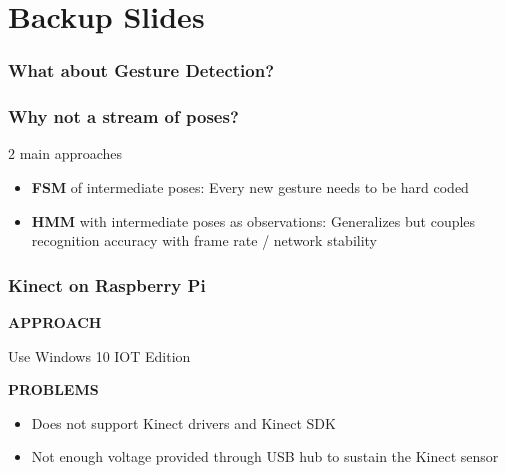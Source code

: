 \section{Backup Slides}

\begin{frame}
\frametitle{What about Gesture Detection?}

\begin{figure}[!htb]
\centering
{}
\end{figure}

\end{frame}

\begin{frame}
\frametitle{Why not a stream of poses?}

$2$ main approaches

\begin{itemize}
\item \textbf{FSM} of intermediate poses: Every new gesture needs to be hard coded
\item \textbf{HMM} with intermediate poses as observations: Generalizes but couples recognition accuracy with frame rate / network stability
\end{itemize}

\end{frame}

\begin{frame}
\frametitle{Kinect on Raspberry Pi}

\textbf{APPROACH}

Use Windows 10 IOT Edition

\textbf{PROBLEMS}

\begin{itemize}
\item Does not support Kinect drivers and Kinect SDK
\item Not enough voltage provided through USB hub to sustain the Kinect sensor
\end{itemize}

\end{frame}



